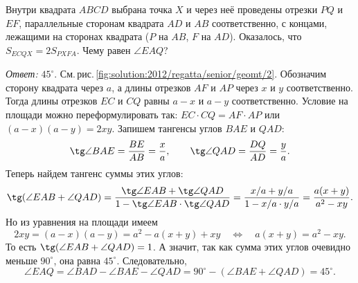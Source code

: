 Внутри квадрата $ABCD$ выбрана точка $X$ и через неё проведены отрезки
$PQ$ и $EF$, параллельные сторонам квадрата $AD$ и $AB$ соответственно,
с концами, лежащими на сторонах квадрата ($P$ на $AB$, $F$ на $AD$).
Оказалось, что $S_{ECQX} = 2 S_{PXFA}$.
Чему равен $\angle EAQ$?

\label{solution:2012/regatta/senior/geomt/2}%
\emph{Ответ:} $45^\circ$.
См.\,рис.\,\ref{fig:solution:2012/regatta/senior/geomt/2}.
Обозначим сторону квадрата через $a$, а длины отрезков $AF$ и $AP$ через
$x$ и $y$ соответственно.
Тогда длины отрезков $EC$ и $CQ$ равны $a - x$ и $a - y$ соответственно.
Условие на площади можно переформулировать так:
$EC \cdot CQ = AF \cdot AP$ или $(a - x) (a - y) = 2 x y$.
Запишем тангенсы углов $BAE$ и $QAD$:
\[
    \tg \angle BAE = \dfrac{BE}{AB} = \dfrac{x}{a}
,\qquad
    \tg \angle QAD = \dfrac{DQ}{AD} = \dfrac{y}{a}
.\]
Теперь найдем тангенс суммы этих углов:
\[
    \tg (\angle EAB + \angle QAD)
=
    \dfrac{
        \tg \angle EAB + \tg \angle QAD
    }{
        1 - \tg \angle EAB \cdot \tg \angle QAD
    }
=
    \dfrac{x / a + y / a}{1 - x / a \cdot y / a}
=
    \dfrac{a(x + y)}{a^2 - xy}
.\]
Но из уравнения на площади имеем
\[
    2 x y = (a - x) (a - y) = a^2 - a(x + y) + xy
\quad\Leftrightarrow\quad
    a (x + y) = a^2 - x y
.\]
То есть $\tg (\angle EAB + \angle QAD) = 1$.
А значит, так как сумма этих углов очевидно меньше $90^\circ$,
она равна $45^\circ$.
Следовательно,
\[
    \angle EAQ = \angle BAD - \angle BAE - \angle QAD
=
    90^\circ - (\angle BAE + \angle QAD) = 45^\circ
.\]

